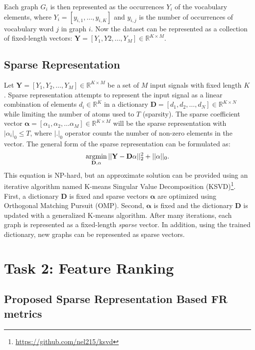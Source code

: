 Each graph $G_i$ is then represented as the occurrences $Y_i$ of the vocabulary elements, where $Y_i = [y_{i,1}, \dots , y_{i,K}]$ and $y_{i,j}$ is the number of occurrences of vocabulary word $j$ in graph $i$. Now the dataset can be represented as a collection of fixed-length vectors: $\mathbf{Y} = [Y_1, Y2, \dots , Y_M] \in \mathbb{R}^{K \times M}$.


\subsection{Sparse Representation}

Let $\mathbf{Y} = [Y_1, Y_2, \dots, Y_M] \in \mathbb{R}^{K \times M}$ be a set of $M$ input signals with fixed length $K$. Sparse representation attempts to represent the input signal as a linear combination of elements $d_i \in \mathbb{R}^{K}$ in a dictionary $\mathbf{D} = [d_1, d_2, \dots , d_N] \in \mathbb{R}^{K \times N}$ while limiting the number of atoms used to $T$ (sparsity). The sparse coefficient vector $\mathbf{\alpha} = [\alpha_1, \alpha_2, \dots \alpha_M] \in \mathbb{R}^{K \times M}$ will be the sparse representation with $|\alpha_i|_0 \leq T$, where $|.|_0$ operator counts the number of non-zero elements in the vector. The general form of the sparse representation can be formulated as:
\begin{align}
\label{eqn: SR}
    \operatorname*{argmin}_{\mathbf{D}, \mathbf{\alpha}} || \mathbf{Y} - \mathbf{D\alpha}||_2^2 + ||\mathbf{\alpha}||_0.
\end{align}
This equation is NP-hard, but an approximate solution can be provided using an iterative algorithm named K-means Singular Value Decomposition (KSVD)\cite{Aharon2006}\footnote{\url{https://github.com/nel215/ksvd}}. First, a dictionary $\mathbf{D}$ is fixed and sparse vectors $\mathbf{\alpha}$ are optimized using Orthogonal Matching Pursuit (OMP)\cite{Pati1993}. Second, $\mathbf{\alpha}$ is fixed and the dictionary $\mathbf{D}$ is updated with a generalized K-means algorithm. After many iterations, each graph is represented as a fixed-length \emph{sparse} vector. In addition, using the trained dictionary, new graphs can be represented as sparse vectors.


\section{Task 2: Feature Ranking}

\subsection{Proposed Sparse Representation Based FR metrics}

